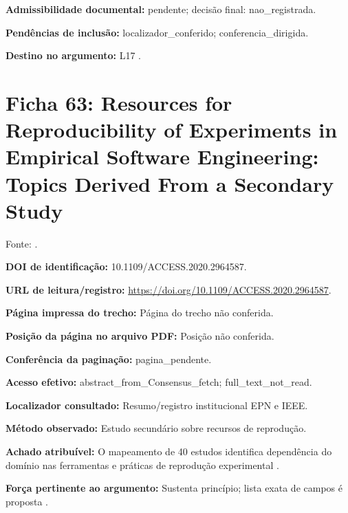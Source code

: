 \noindent\textbf{Admissibilidade documental:} pendente; decisão final: nao\_registrada.\par\medskip

\noindent\textbf{Pendências de inclusão:} localizador\_conferido; conferencia\_dirigida.\par\medskip

\noindent\textbf{Destino no argumento:} L17 .

\clearpage\section*{Ficha 63: Resources for Reproducibility of Experiments in Empirical Software Engineering: Topics Derived From a Secondary Study}

Fonte: \citet{eng11}.

\noindent\textbf{DOI de identificação:} 10.1109/ACCESS.2020.2964587.\par\medskip

\noindent\textbf{URL de leitura/registro:} \url{https://doi.org/10.1109/ACCESS.2020.2964587}.\par\medskip

\noindent\textbf{Página impressa do trecho:} Página do trecho não conferida.\par\medskip

\noindent\textbf{Posição da página no arquivo PDF:} Posição não conferida.\par\medskip

\noindent\textbf{Conferência da paginação:} pagina\_pendente.\par\medskip

\noindent\textbf{Acesso efetivo:} abstract\_from\_Consensus\_fetch; full\_text\_not\_read.\par\medskip

\noindent\textbf{Localizador consultado:} Resumo/registro institucional EPN e IEEE.\par\medskip

\noindent\textbf{Método observado:} Estudo secundário sobre recursos de reprodução.\par\medskip

\noindent\textbf{Achado atribuível:} O mapeamento de 40 estudos identifica dependência do domínio nas ferramentas e práticas de reprodução experimental \citep{eng11}.\par\medskip

\noindent\textbf{Força pertinente ao argumento:} Sustenta princípio; lista exata de campos é proposta \citep{eng11}.\par\medskip

